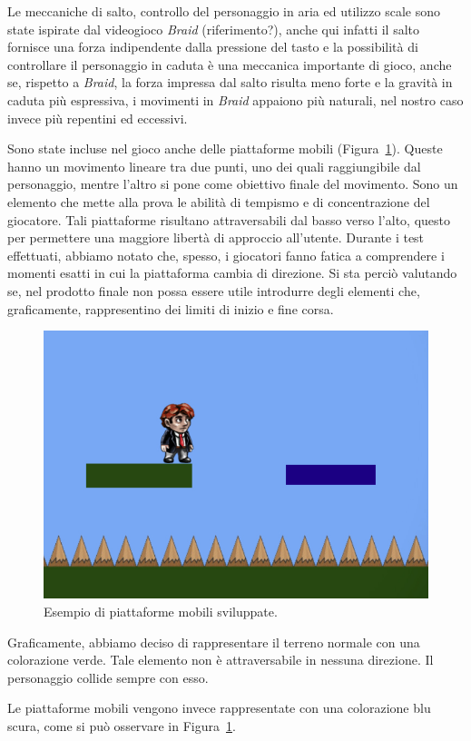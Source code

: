 Le meccaniche di salto, controllo del personaggio in aria ed utilizzo scale sono state ispirate dal videogioco \textit{Braid} (riferimento?), anche qui infatti il salto fornisce una forza indipendente dalla pressione del tasto e la possibilità di controllare il personaggio in caduta è una meccanica importante di gioco, anche se, rispetto a \textit{Braid}, la forza impressa dal salto risulta meno forte e la gravità in caduta più espressiva, i movimenti in \textit{Braid} appaiono più naturali, nel nostro caso invece più repentini ed eccessivi.

Sono state incluse nel gioco anche delle piattaforme mobili (Figura~\ref{fig:platform_piattaforme_mobili}). Queste hanno un movimento lineare tra due punti, uno dei quali raggiungibile dal personaggio, mentre l’altro si pone come obiettivo finale del movimento. Sono un elemento che mette alla prova le abilità di tempismo e di concentrazione del giocatore. Tali piattaforme risultano attraversabili dal basso verso l’alto, questo per permettere una maggiore libertà di approccio all’utente.
Durante i test effettuati, abbiamo notato che, spesso, i giocatori fanno fatica a comprendere i momenti esatti in cui la piattaforma cambia di direzione. Si sta perciò valutando se, nel prodotto finale non possa essere utile introdurre degli elementi che, graficamente, rappresentino dei limiti di inizio e fine corsa.

\begin{figure}%
	\centering
	\includegraphics[width= 0.6\columnwidth]{images/gameDesign/07.jpg}
	\caption{Esempio di piattaforme mobili sviluppate.}
	\label{fig:platform_piattaforme_mobili}
\end{figure}

Graficamente, abbiamo deciso di rappresentare il terreno normale con una colorazione verde. Tale elemento non è attraversabile in nessuna direzione. Il personaggio collide sempre con esso.

Le piattaforme mobili vengono invece rappresentate con una colorazione blu scura, come si può osservare in Figura~\ref{fig:platform_piattaforme_mobili}.

